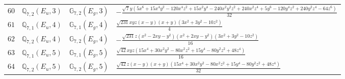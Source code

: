 \documentclass[fleqn,8pt,landscape]{jsarticle}
\begin{document}
\begin{table}[ht!]
\begin{center}
\begin{tabular}{cccl}
$ 60 $ & $ \mathbb{Q}_{7,2}(E_{u},3) $ & $ \mathbb{G}_{7,2}(E_{g},3) $ & $ - \frac{\sqrt{7} y \left(5 x^{6} + 15 x^{4} y^{2} - 120 x^{4} z^{2} + 15 x^{2} y^{4} - 240 x^{2} y^{2} z^{2} + 240 x^{2} z^{4} + 5 y^{6} - 120 y^{4} z^{2} + 240 y^{2} z^{4} - 64 z^{6}\right)}{32} $ \\
$ 61 $ & $ \mathbb{Q}_{7,1}(E_{u},4) $ & $ \mathbb{G}_{7,1}(E_{g},4) $ & $ \frac{\sqrt{231} x y z \left(x - y\right) \left(x + y\right) \left(3 x^{2} + 3 y^{2} - 10 z^{2}\right)}{4} $ \\
$ 62 $ & $ \mathbb{Q}_{7,2}(E_{u},4) $ & $ \mathbb{G}_{7,2}(E_{g},4) $ & $ - \frac{\sqrt{231} z \left(x^{2} - 2 x y - y^{2}\right) \left(x^{2} + 2 x y - y^{2}\right) \left(3 x^{2} + 3 y^{2} - 10 z^{2}\right)}{16} $ \\
$ 63 $ & $ \mathbb{Q}_{7,1}(E_{u},5) $ & $ \mathbb{G}_{7,1}(E_{g},5) $ & $ \frac{\sqrt{42} x y z \left(15 x^{4} + 30 x^{2} y^{2} - 80 x^{2} z^{2} + 15 y^{4} - 80 y^{2} z^{2} + 48 z^{4}\right)}{16} $ \\
$ 64 $ & $ \mathbb{Q}_{7,2}(E_{u},5) $ & $ \mathbb{G}_{7,2}(E_{g},5) $ & $ \frac{\sqrt{42} z \left(x - y\right) \left(x + y\right) \left(15 x^{4} + 30 x^{2} y^{2} - 80 x^{2} z^{2} + 15 y^{4} - 80 y^{2} z^{2} + 48 z^{4}\right)}{32} $ \\
 \hline \hline
\end{tabular}
\end{center}
\end{table}
\end{document}
